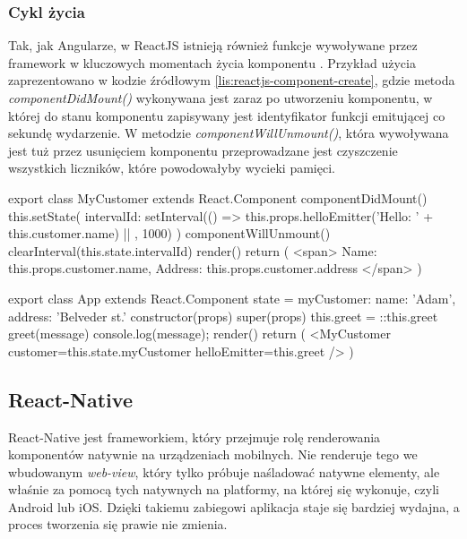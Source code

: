 	 \subsubsection{Cykl życia}
	 Tak, jak Angularze, w ReactJS istnieją również funkcje wywoływane przez framework w kluczowych momentach życia komponentu \cite{reactjs-component-doc}. Przykład użycia zaprezentowano w kodzie źródłowym \ref{lis:reactjs-component-create}, gdzie metoda \textit{componentDidMount()} wykonywana jest zaraz po utworzeniu komponentu, w której do stanu komponentu zapisywany jest identyfikator funkcji emitującej co sekundę wydarzenie. W metodzie \textit{componentWillUnmount()}, która wywoływana jest tuż przez usunięciem komponentu przeprowadzane jest czyszczenie wszystkich liczników, które powodowałyby wycieki pamięci.
	 
	 \begin{code}[
		language=javascript,
		caption={Utworzenie komponentu z danymi wejściowymi w ReactJS (źródło: opracowanie własne)},
		label={lis:reactjs-component-create},
		escapechar=|
	]
export class MyCustomer extends React.Component {
  componentDidMount() {
    this.setState({
      intervalId: setInterval(() => {
        this.props.helloEmitter('Hello: ' + this.customer.name) |\label{reactjs-props-use}|
      }, 1000)
    })
  }
  componentWillUnmount() {
    clearInterval(this.state.intervalId)
  }
  render() {
    return (
      <span>
        Name: {this.props.customer.name},
        Address: {this.props.customer.address}
      </span>
    )
  }
}
	\end{code}
	
	 \begin{code}[
		language=javascript,
		caption={Użycie komponentu z danymi wejściowymi w ReactJS (źródło: opracowanie własne)},
		label={lis:reactjs-component-use},
		escapechar=|
	]
export class App extends React.Component {
  state = {
    myCustomer: {
      name: 'Adam',
      address: 'Belveder st.'
    }
  }
  constructor(props) {
    super(props)
    this.greet = ::this.greet
  }
  greet(message) {
    console.log(message);
  }
  render() {
    return (
      <MyCustomer 
          customer={this.state.myCustomer}
          helloEmitter={this.greet}
      />
    )
  }
}
	\end{code}
	 
	 \subsection{React-Native}
	 React-Native jest frameworkiem, który przejmuje rolę renderowania komponentów natywnie na urządzeniach mobilnych. Nie renderuje tego we wbudowanym \textit{web-view}, który tylko próbuje naśladować natywne elementy, ale właśnie za pomocą tych natywnych na platformy, na której się wykonuje, czyli Android lub iOS. Dzięki takiemu zabiegowi aplikacja staje się bardziej wydajna, a proces tworzenia się prawie nie zmienia.
